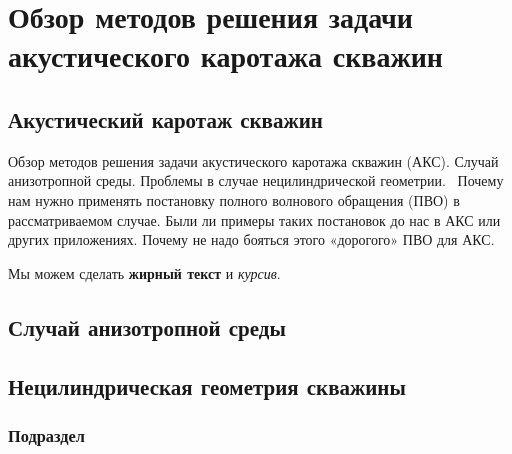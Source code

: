 \chapter{Обзор методов решения задачи акустического каротажа скважин}\label{ch:ch_my_1}

\section{Акустический каротаж скважин}\label{sec:ch_my_1/sec1}

Обзор методов решения задачи акустического каротажа скважин (АКС). Случай анизотропной среды. Проблемы в случае нецилиндрической геометрии.  Почему нам нужно применять постановку полного волнового обращения (ПВО) в рассматриваемом случае. Были ли примеры таких постановок до нас в АКС или других приложениях. Почему не надо бояться этого «дорогого» ПВО для АКС.  

Мы можем сделать \textbf{жирный текст} и \textit{курсив}.

\section{Случай анизотропной среды}\label{sec:ch_my_1/sec2}


\section{Нецилиндрическая геометрия скважины}\label{sec:ch_my_1/sec3}


\subsection{Подраздел}\label{subsec:ch_my_1/sec3/sub1}

